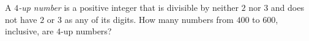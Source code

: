 A \emph{$4$-up number} is a positive integer that is divisible by neither $2$ nor $3$ and does not have $2$ or $3$ as any of its digits. How many numbers from $400$ to $600$, inclusive, are $4$-up numbers?
